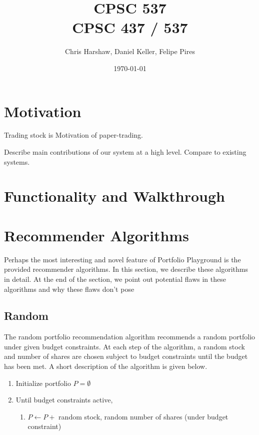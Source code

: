 \documentclass{article}
\begin{document}
\title{CPSC 537  \\ CPSC 437 / 537}
\author{Chris Harshaw, Daniel Keller, Felipe Pires}
\date{\today}
\maketitle

\pagestyle{fancy}
\fancyhf{}
\rfoot{\thepage}



\section{Motivation}
Trading stock is 
Motivation of paper-trading.

Describe main contributions of our system at a high level. Compare to existing systems.

\section{Functionality and Walkthrough}

\section{Recommender Algorithms}
Perhaps the most interesting and novel feature of Portfolio Playground is the provided recommender algorithms. In this section, we describe these algorithms in detail. At the end of the section, we point out potential flaws in these algorithms and why these flaws don't pose 

\subsection{Random}
The random portfolio recommendation algorithm recommends a random portfolio under given budget constraints. At each step of the algorithm, a random stock and number of shares are chosen subject to budget constraints until the budget has been met. A short description of the algorithm is given below.

\begin{enumerate}
	\item Initialize portfolio $P = \emptyset$
	\item Until budget constraints active,
		\begin{enumerate}
			\item $P \leftarrow P +$ random stock, random number of shares (under budget constraint)
		\end{enumerate}
\end{enumerate}
\end{document}
